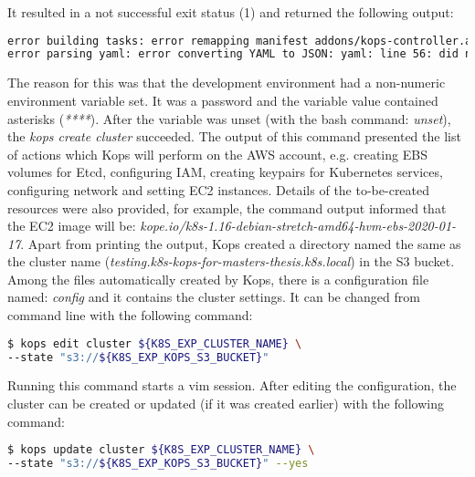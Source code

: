 It resulted in a not successful exit status (1) and returned the following output:
\begin{lstlisting}[basicstyle=\tiny,caption={Output from command used to make Kops create the cluster configuration and put it in the S3 bucket},captionpos=b,language=Bash,xleftmargin=1cm]
error building tasks: error remapping manifest addons/kops-controller.addons.k8s.io/k8s-1.16.yaml: \
error parsing yaml: error converting YAML to JSON: yaml: line 56: did not find expected alphabetic or numeric character
\end{lstlisting}
The reason for this was that the development environment had a non-numeric environment variable set. It was a password and the variable value contained asterisks (\textit{****}). After the variable was unset (with the bash command: \textit{unset}), the \textit{kops create cluster} succeeded. The output of this command presented the list of actions which Kops will perform on the AWS account, e.g. creating EBS volumes for Etcd, configuring IAM, creating keypairs for Kubernetes services, configuring network and setting EC2 instances. Details of the to-be-created resources were also provided, for example, the command output informed that the EC2 image will be: \textit{kope.io/k8s-1.16-debian-stretch-amd64-hvm-ebs-2020-01-17}. Apart from printing the output, Kops created a directory named the same as the cluster name (\textit{testing.k8s-kops-for-masters-thesis.k8s.local}) in the S3 bucket. Among the files automatically created by Kops, there is a configuration file named: \textit{config} and it contains the cluster settings. It can be changed from command line with the following command:
\begin{lstlisting}[basicstyle=\small,caption={Command used to edit a Kubernetes cluster managed by Kops},captionpos=b,language=Bash,xleftmargin=1cm]
$ kops edit cluster ${K8S_EXP_CLUSTER_NAME} \
--state "s3://${K8S_EXP_KOPS_S3_BUCKET}"
\end{lstlisting}
Running this command starts a vim session. After editing the configuration, the cluster can be created or updated (if it was created earlier) with the following command:
\begin{lstlisting}[basicstyle=\small,caption={Command used to edit a Kubernetes cluster managed by Kops},captionpos=b,language=Bash,xleftmargin=1cm]
$ kops update cluster ${K8S_EXP_CLUSTER_NAME} \
--state "s3://${K8S_EXP_KOPS_S3_BUCKET}" --yes
\end{lstlisting}

